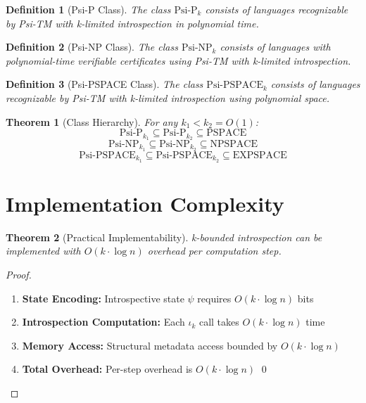 \documentclass[11pt]{article}
\newtheorem{theorem}{Theorem}
\newtheorem{definition}{Definition}
\begin{document}
\begin{definition}[Psi-P Class]
The class $\text{Psi-P}_k$ consists of languages recognizable by Psi-TM with k-limited introspection in polynomial time.
\end{definition}

\begin{definition}[Psi-NP Class]
The class $\text{Psi-NP}_k$ consists of languages with polynomial-time verifiable certificates using Psi-TM with k-limited introspection.
\end{definition}

\begin{definition}[Psi-PSPACE Class]
The class $\text{Psi-PSPACE}_k$ consists of languages recognizable by Psi-TM with k-limited introspection using polynomial space.
\end{definition}

\begin{theorem}[Class Hierarchy]
For any $k_1 < k_2 = O(1)$:
$$\text{Psi-P}_{k_1} \subseteq \text{Psi-P}_{k_2} \subseteq \text{PSPACE}$$
$$\text{Psi-NP}_{k_1} \subseteq \text{Psi-NP}_{k_2} \subseteq \text{NPSPACE}$$
$$\text{Psi-PSPACE}_{k_1} \subseteq \text{Psi-PSPACE}_{k_2} \subseteq \text{EXPSPACE}$$
\end{theorem}

\section{Implementation Complexity}

\begin{theorem}[Practical Implementability]
k-bounded introspection can be implemented with $O(k \cdot \log n)$ overhead per computation step.
\end{theorem}

\begin{proof}
\begin{enumerate}
\item \textbf{State Encoding:} Introspective state $\psi$ requires $O(k \cdot \log n)$ bits
\item \textbf{Introspection Computation:} Each $\iota_k$ call takes $O(k \cdot \log n)$ time
\item \textbf{Memory Access:} Structural metadata access bounded by $O(k \cdot \log n)$
\item \textbf{Total Overhead:} Per-step overhead is $O(k \cdot \log n)$ \qed
\end{enumerate}
\end{proof}
\end{document}
